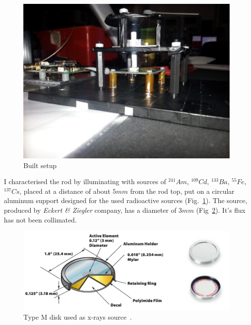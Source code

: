 \documentclass[10pt,a4paper, openany]{book}
\begin{document}
\begin{figure}[!h]
\begin{center}
\includegraphics[scale=0.28]{imm/support1.jpg}
\end{center}
\caption{Built setup}
\label{fig:support1}
\end{figure}
\newpage
I characterised the rod by illuminating with sources of $^{241}Am$, $^{109}Cd$, $^{133}Ba$, $^{55}Fe$, $^{137}Cs$, placed at a distance of about $5mm$ from the rod top, put on a circular aluminum support designed for the used radioactive sources (Fig.~\ref{fig:support1}). The source, produced by \emph{Eckert \& Ziegler} company, has a diameter of $3mm$ (Fig~\ref{fig:source}). It's flux has not been collimated.\\

\begin{figure}[!h]
\begin{center}
\includegraphics[scale=0.38]{imm/source.png}
\end{center}
\caption{Type M disk used as x-rays source~\cite{instr:sou}. }
\label{fig:source}
\end{figure}
\end{document}
